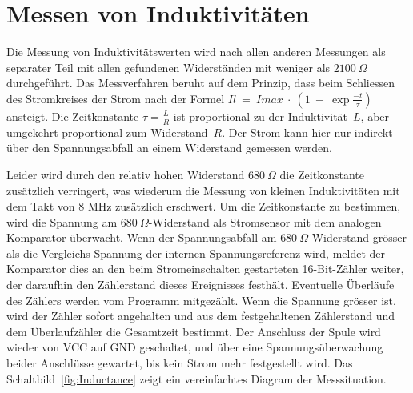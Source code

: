 \section{Messen von Induktivitäten}
Die Messung von Induktivitätswerten wird nach allen anderen Messungen als separater Teil mit allen
gefundenen Widerständen mit weniger als \(2100~\Omega\) durchgeführt.
Das Messverfahren beruht auf dem Prinzip, dass beim Schliessen des Stromkreises der Strom nach
der Formel \(Il~=~Imax~\cdot~(1~-~\exp{\frac{-t}{\tau}})\) ansteigt.
Die Zeitkonstante \(\tau = \frac{L}{R}\) ist proportional zu der Induktivität~\(L\), aber umgekehrt
proportional zum Widerstand~\(R\). 
Der Strom kann hier nur indirekt über den Spannungsabfall an einem Widerstand
gemessen werden.

Leider wird durch den relativ hohen Widerstand \(680~\Omega\) die Zeitkonstante zusätzlich verringert, was
wiederum die Messung von kleinen Induktivitäten mit dem Takt von 8 MHz zusätzlich erschwert.
Um die Zeitkonstante zu bestimmen, wird die Spannung am \(680~\Omega\)-Widerstand als Stromsensor
mit dem analogen Komparator überwacht. Wenn der Spannungsabfall am \(680~\Omega\)-Widerstand grösser als
die Vergleichs-Spannung der internen Spannungsreferenz wird, meldet der Komparator dies an den beim
Stromeinschalten gestarteten 16-Bit-Zähler weiter, der daraufhin den Zählerstand dieses
Ereignisses festhält. Eventuelle Überläufe des Zählers werden vom Programm mitgezählt. 
Wenn die Spannung grösser ist, wird der Zähler sofort angehalten und aus dem festgehaltenen Zählerstand und
dem Überlaufzähler die Gesamtzeit bestimmt.
Der Anschluss der Spule wird wieder von VCC auf GND geschaltet, und über eine Spannungsüberwachung beider
Anschlüsse gewartet, bis kein Strom mehr festgestellt wird.
Das Schaltbild~\ref{fig:Inductance} zeigt ein vereinfachtes Diagram der Messsituation.

